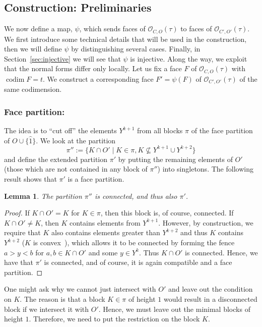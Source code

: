 \documentclass[12pt,a4paper]{amsart}
\newtheorem{lemma}[theorem]{Lemma}
\theoremstyle{definition}
\newcommand{\OP}{\mathcal{O}}
\DeclareMathOperator{\codim}{codim}
\begin{document}
\subsection{Construction: Preliminaries}
We now define a map, $\psi$, which sends faces of $\OP_{C,O}(\tau)$ to faces of $\OP_{C',O'}(\tau)$.
We first introduce some technical details that will be used in the construction, then we will define $\psi$ by distinguishing several cases.
Finally, in Section~\ref{sec:injective} we will see that $\psi$ is injective.
Along the way, we exploit that the normal forms differ only locally.
Let us fix a face $F$ of $\OP_{C,O}(\tau)$ with $\codim F = t$. We construct a corresponding face $F'=\psi(F)$ of $\OP_{C',O'}(\tau)$ of the same codimension.
\subsubsection{Face partition:}
The idea is to \enquote{cut off} the elements $Y^{k+1}$ from all blocks $\pi$ of the face partition of $O\cup\{\hat{1}\}$. 
We look at the partition
\begin{equation*}
  \pi'':=\{K\cap O'\mid K\in \pi, K\not\subseteq Y^{{k+1}}\cup Y^{{k+2}}\}
\end{equation*}
and define the extended partition $\pi'$ by putting the remaining elements of $O'$ (those which are not contained in any block of $\pi''$) into singletons.
The following result shows that $\pi'$ is a face partition.
\begin{lemma}
  The partition $\pi''$ is connected, and thus also $\pi'$.
\end{lemma}
\begin{proof}
  If $K\cap O'=K$ for $K\in \pi$, then this block is, of course, connected. 
  If $K\cap O'\neq K$, then $K$ contains elements from $Y^{{k+1}}$. 
  However, by construction, we require that $K$ also contains elements greater than $Y^{{k+2}}$ and thus $K$ contains $Y^{{k+2}}$ ($K$ is convex~{\cite[Remark 3.8]{Peg18}}), which allows it to be connected by forming the fence $a>y<b$ for $a,b\in K\cap O'$ and some $y\in Y^{k}$. 
  Thus $K\cap O'$ is connected.
  Hence, we have that $\pi'$ is connected, and of course, it is again compatible and a face partition.
\end{proof}

One might ask why we cannot just intersect with $O'$ and leave out the condition on $K$. 
The reason is that a block $K\in\pi$ of height $1$ would result in a disconnected block if we intersect it with $O'$.
Hence, we must leave out the minimal blocks of height $1$.
Therefore, we need to put the restriction on the block $K$.
\end{document}
